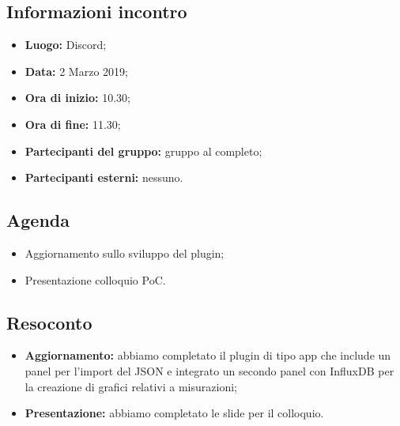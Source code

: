 \subsection{Informazioni incontro}
\begin{itemize}
	\item { \textbf{Luogo:} Discord};
	\item { \textbf{Data:} 2 Marzo 2019};
	\item { \textbf{Ora di inizio:} 10.30};
	\item { \textbf{Ora di fine:} 11.30};
	\item { \textbf{Partecipanti del gruppo:} gruppo al completo};
	\item { \textbf{Partecipanti esterni:} nessuno}.
\end{itemize}


\subsection{Agenda}
\begin{itemize}
	\item {Aggiornamento sullo sviluppo del plugin;}
	\item {Presentazione colloquio PoC.}
\end{itemize}

\subsection{Resoconto}
\begin{itemize}
	\item { \textbf{Aggiornamento:} abbiamo completato il plugin di tipo app che include un panel per l'import del JSON e integrato un secondo panel con InfluxDB per la creazione di grafici relativi a misurazioni;}
	\item { \textbf{Presentazione:} abbiamo completato le slide per il colloquio.}
\end{itemize}

